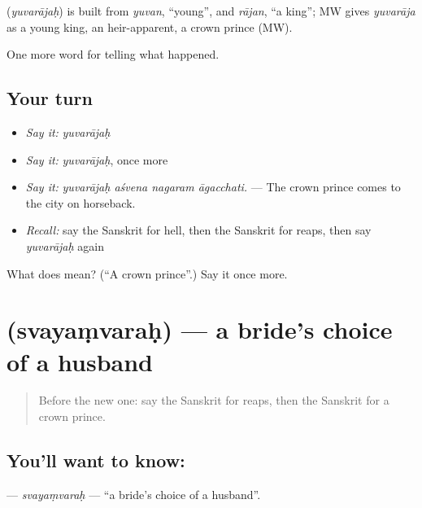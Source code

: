 \begin{cousinweb}
\textbf{} (\emph{yuvarājaḥ}) is built from \emph{yuvan}, \textquotedblleft{}young\textquotedblright{}, and \emph{rājan}, \textquotedblleft{}a king\textquotedblright{}; MW gives \emph{yuvarāja} as a young king, an heir-apparent, a crown prince (MW).
\end{cousinweb}

\begin{grammarlens}[title={What you've built}]
One more word for telling what happened.
\end{grammarlens}

\subsection*{Your turn}
\begin{itemize}
\raggedright
  \item \emph{Say it:} \emph{yuvarājaḥ}
  \item \emph{Say it:} \emph{yuvarājaḥ}, once more
  \item \emph{Say it:} \emph{yuvarājaḥ aśvena nagaram āgacchati.} — The crown prince comes to the city on horseback.
  \item \emph{Recall:} say the Sanskrit for hell, then the Sanskrit for reaps, then say \emph{yuvarājaḥ} again
\end{itemize}

\begin{tcolorbox}[breakable,colback=teal!4,colframe=teal!35!black,title={Before you move on}]
What does  mean? (\textquotedblleft{}A crown prince\textquotedblright{}.) Say it once more.
\end{tcolorbox}
\section[\texorpdfstring{\sk{स्वयंवरः} (svayaṃvaraḥ)}{स्वयंवरः (svayaṃvaraḥ)}]{ (svayaṃvaraḥ) — a bride's choice of a husband}

\label{lesson:SA-C339-svayamvarah}



\begin{quote}
Before the new one: say the Sanskrit for reaps, then the Sanskrit for a crown prince.
\end{quote}

\subsection*{You'll want to know: }
\textbf{} — \emph{svayaṃvaraḥ} — \textquotedblleft{}a bride's choice of a husband\textquotedblright{}.

